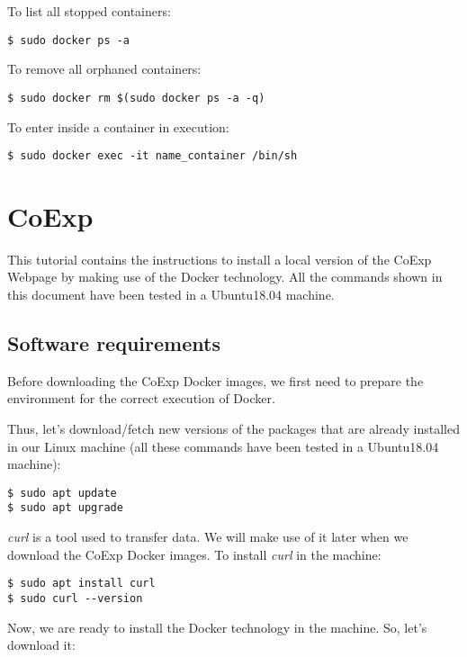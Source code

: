 \documentclass[]{book}
\begin{document}
To list all stopped containers:

\begin{verbatim}
$ sudo docker ps -a 
\end{verbatim}

To remove all orphaned containers:

\begin{verbatim}
$ sudo docker rm $(sudo docker ps -a -q)
\end{verbatim}

To enter inside a container in execution:

\begin{verbatim}
$ sudo docker exec -it name_container /bin/sh
\end{verbatim}

\section{CoExp}\label{coexp}

This tutorial contains the instructions to install a local version of
the CoExp Webpage by making use of the Docker technology. All the
commands shown in this document have been tested in a Ubuntu18.04
machine.

\subsection{Software requirements}\label{software-requirements}

Before downloading the CoExp Docker images, we first need to prepare the
environment for the correct execution of Docker.

Thus, let's download/fetch new versions of the packages that are already
installed in our Linux machine (all these commands have been tested in a
Ubuntu18.04 machine):

\begin{verbatim}
$ sudo apt update
$ sudo apt upgrade
\end{verbatim}

\emph{curl} is a tool used to transfer data. We will make use of it
later when we download the CoExp Docker images. To install \emph{curl}
in the machine:

\begin{verbatim}
$ sudo apt install curl
$ sudo curl --version
\end{verbatim}

Now, we are ready to install the Docker technology in the machine. So,
let's download it:
\end{document}
